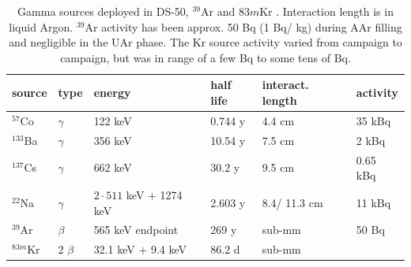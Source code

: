 \begin{table}[htbp]
\centering
\caption{Gamma sources deployed in DS-50, $^{39}$Ar and $83m$Kr \cite{Lippincott:2010jb}. Interaction length is in liquid Argon. $^{39}$Ar activity has been approx. 50 Bq (1 Bq/ kg) during AAr filling and negligible in the UAr phase. The Kr source activity varied from campaign to campaign, but was in range of a few Bq to some tens of Bq.} %
\centering
\begin{tabular}{|l|l|l|l|l|l|}
\hline
\textbf{source} & \textbf{type} & \textbf{energy} & \textbf{half life} & \textbf{interact. length} & \textbf{activity} \\ \hline
$^{57}$Co & $\gamma$ & 122 keV & 0.744 y & 4.4 cm & 35 kBq \\ \hline
$^{133}$Ba & $\gamma$ & 356 keV & 10.54 y & 7.5 cm & 2 kBq \\ \hline
$^{137}$Cs & $\gamma$ & 662 keV & 30.2 y & 9.5 cm & 0.65 kBq \\ \hline
$^{22}$Na & $\gamma$ & $2\cdot 511$ keV + 1274 keV & 2.603 y & 8.4/ 11.3 cm & 11 kBq \\ \hline\hline
$^{39}$Ar & $\beta$ &  565 keV endpoint& 269 y & sub-mm & 50 Bq\\ \hline
$^{83m}$Kr & 2 $\beta$ &  32.1 keV + 9.4 keV & 86.2 d & sub-mm & \\ \hline
\end{tabular}
\label{tbl:GammaSources}
\end{table}

